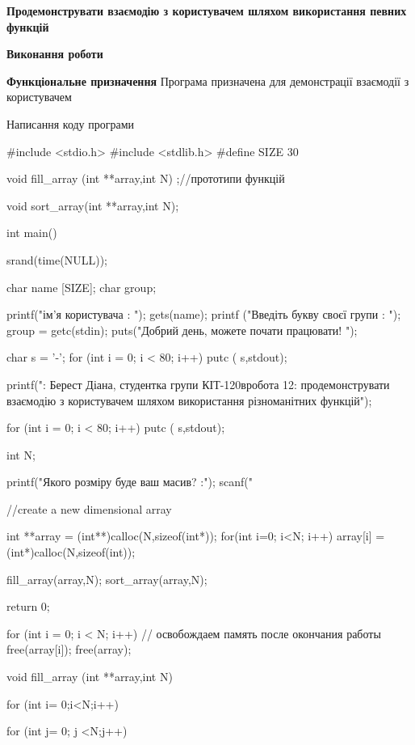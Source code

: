 
\begin{DoxyEnumerate}
\item {\bfseries{Продемонструвати взаємодію з користувачем шляхом використання певних функцій}}
\end{DoxyEnumerate}

{\bfseries{Виконання роботи}}
\begin{DoxyEnumerate}
\item {\bfseries{Функціональне призначення}} Програма призначена для демонстрації взаємодії з користувачем
\item Написання коду програми \begin{DoxyVerb} #include <stdio.h>
 #include <stdlib.h>
 #define SIZE 30

 void fill_array (int **array,int  N) ;//прототипи функцій

 void sort_array(int **array,int N);

 int main() 
 {
 srand(time(NULL));

 char name [SIZE];
 char group;

 printf("\n{} ім'я користувача : ");
 gets(name);
 printf ("Введіть букву своєї групи : ");
 group = getc(stdin);
 puts("Добрий день, можете почати працювати! \n");

 char s = '-';
 for (int i = 0; i < 80; i++)
 {
 putc ( s,stdout);
 }

 printf("\n{} : Берест Діана, студентка групи КІТ-120в\n{} робота 12\n{} : продемонструвати взаємодію з користувачем шляхом використання різноманітних функцій\n\n");


 for (int i = 0; i < 80; i++)
 {
     putc ( s,stdout);
 }

 int N;

 printf("Якого розміру буде ваш масив? :");
 scanf("%

    //create a new dimensional array

 int **array = (int**)calloc(N,sizeof(int*));
 for(int i=0; i<N; i++)
 {
 array[i] = (int*)calloc(N,sizeof(int));
 }



 fill_array(array,N);
 sort_array(array,N);

 return 0;

 for (int i = 0; i < N; i++) // освобождаем память после окончания работы 
 { 
 free(array[i]);
 }
 free(array);

 }


 void fill_array (int **array,int N) 
 { 
 for (int i= 0;i<N;i++)
 {
 for (int j= 0; j <N;j++) 
 {

}}}
\end{DoxyVerb}
\end{DoxyEnumerate}
